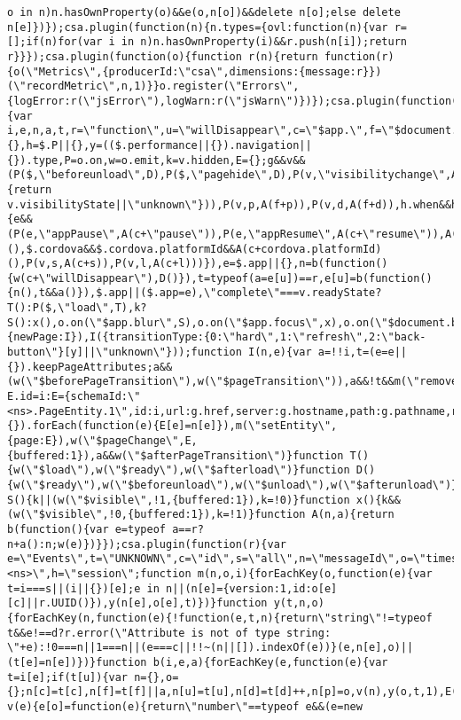 \documentclass[
]{article}
\begin{document}
\begin{verbatim}
o in n)n.hasOwnProperty(o)&&e(o,n[o])&&delete n[o];else delete n[e]})});csa.plugin(function(n){n.types={ovl:function(n){var r=[];if(n)for(var i in n)n.hasOwnProperty(i)&&r.push(n[i]);return r}}});csa.plugin(function(o){function r(n){return function(r){o(\"Metrics\",{producerId:\"csa\",dimensions:{message:r}})(\"recordMetric\",n,1)}}o.register(\"Errors\",{logError:r(\"jsError\"),logWarn:r(\"jsWarn\")})});csa.plugin(function(o){var i,e,n,a,t,r=\"function\",u=\"willDisappear\",c=\"$app.\",f=\"$document.\",p=\"focus\",d=\"blur\",s=\"active\",l=\"resign\",$=o.global,b=o.exec,m=o(\"Events\"),g=$.location,v=$.document||{},h=$.P||{},y=(($.performance||{}).navigation||{}).type,P=o.on,w=o.emit,k=v.hidden,E={};g&&v&&(P($,\"beforeunload\",D),P($,\"pagehide\",D),P(v,\"visibilitychange\",A(f,function(){return v.visibilityState||\"unknown\"})),P(v,p,A(f+p)),P(v,d,A(f+d)),h.when&&h.when(\"mash\").execute(function(e){e&&(P(e,\"appPause\",A(c+\"pause\")),P(e,\"appResume\",A(c+\"resume\")),A(c+\"deviceready\")(),$.cordova&&$.cordova.platformId&&A(c+cordova.platformId)(),P(v,s,A(c+s)),P(v,l,A(c+l)))}),e=$.app||{},n=b(function(){w(c+\"willDisappear\"),D()}),t=typeof(a=e[u])==r,e[u]=b(function(){n(),t&&a()}),$.app||($.app=e),\"complete\"===v.readyState?T():P($,\"load\",T),k?S():x(),o.on(\"$app.blur\",S),o.on(\"$app.focus\",x),o.on(\"$document.blur\",S),o.on(\"$document.focus\",x),o.on(\"$document.hidden\",S),o.on(\"$document.visible\",x),o.register(\"SPA\",{newPage:I}),I({transitionType:{0:\"hard\",1:\"refresh\",2:\"back-button\"}[y]||\"unknown\"}));function I(n,e){var a=!!i,t=(e=e||{}).keepPageAttributes;a&&(w(\"$beforePageTransition\"),w(\"$pageTransition\")),a&&!t&&m(\"removeEntity\",\"page\"),i=o.UUID(),t?E.id=i:E={schemaId:\"<ns>.PageEntity.1\",id:i,url:g.href,server:g.hostname,path:g.pathname,referrer:v.referrer,title:v.title},Object.keys(n||{}).forEach(function(e){E[e]=n[e]}),m(\"setEntity\",{page:E}),w(\"$pageChange\",E,{buffered:1}),a&&w(\"$afterPageTransition\")}function T(){w(\"$load\"),w(\"$ready\"),w(\"$afterload\")}function D(){w(\"$ready\"),w(\"$beforeunload\"),w(\"$unload\"),w(\"$afterunload\")}function S(){k||(w(\"$visible\",!1,{buffered:1}),k=!0)}function x(){k&&(w(\"$visible\",!0,{buffered:1}),k=!1)}function A(n,a){return b(function(){var e=typeof a==r?n+a():n;w(e)})}});csa.plugin(function(r){var e=\"Events\",t=\"UNKNOWN\",c=\"id\",s=\"all\",n=\"messageId\",o=\"timestamp\",f=\"producerId\",i=\"application\",a=\"obfuscatedMarketplaceId\",l=\"entities\",u=\"schemaId\",d=\"version\",p=\"attributes\",g=\"<ns>\",h=\"session\";function m(n,o,i){forEachKey(o,function(e){var t=i===s||(i||{})[e];e in n||(n[e]={version:1,id:o[e][c]||r.UUID()}),y(n[e],o[e],t)})}function y(t,n,o){forEachKey(n,function(e){!function(e,t,n){return\"string\"!=typeof t&&e!==d?r.error(\"Attribute is not of type string: \"+e):!0===n||1===n||(e===c||!!~(n||[]).indexOf(e))}(e,n[e],o)||(t[e]=n[e])})}function b(i,e,a){forEachKey(e,function(e){var t=i[e];if(t[u]){var n={},o={};n[c]=t[c],n[f]=t[f]||a,n[u]=t[u],n[d]=t[d]++,n[p]=o,v(n),y(o,t,1),E(o),transport(\"log\",n)}})}function v(e){e[o]=function(e){return\"number\"==typeof e&&(e=new 
\end{verbatim}
\end{document}
